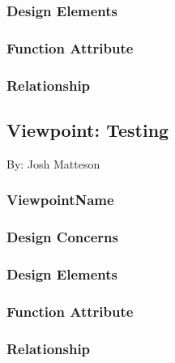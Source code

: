 \documentclass[letterpaper, 10pt, draftclsnofoot, compsoc, onecolumn]{IEEEtran}
\begin{document}
\subsubsection{Design Elements}
{\noindent  \par}

\subsubsection{Function Attribute}
{\noindent  \par}

\subsubsection{Relationship}






\newpage
\subsection{Viewpoint: Testing}
{\noindent By: Josh Matteson \par}

\subsubsection{ViewpointName}
{\noindent  \par}

\subsubsection{Design Concerns}
{\noindent  \par}

\subsubsection{Design Elements}
{\noindent  \par}

\subsubsection{Function Attribute}
{\noindent  \par}

\subsubsection{Relationship}
\end{document}

